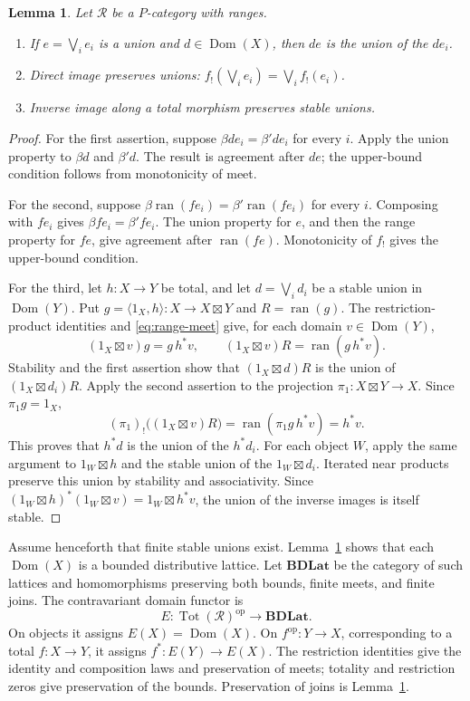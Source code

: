\documentclass[11pt]{article}
\newtheorem{lemma}[theorem]{Lemma}
\theoremstyle{definition}
\newcommand{\R}{\mathscr R}
\newcommand{\BDLat}{\mathbf{BDLat}}
\newcommand{\Tot}{\operatorname{Tot}}
\newcommand{\ran}{\operatorname{ran}}
\begin{document}
\begin{lemma}\label{lem:union-calculus}
Let $\R$ be a $P$-category with ranges.
\begin{enumerate}
\item If $e=\bigvee_i e_i$ is a union and $d\in\operatorname{Dom}(X)$, then $de$ is
      the union of the $de_i$.
\item Direct image preserves unions:
      $f_!(\bigvee_i e_i)=\bigvee_i f_!(e_i)$.
\item Inverse image along a total morphism preserves stable unions.
\end{enumerate}
\end{lemma}
\begin{proof}
For the first assertion, suppose $\beta de_i=\beta'de_i$ for every $i$.
Apply the union property to $\beta d$ and $\beta'd$. The result is agreement
after $de$; the upper-bound condition follows from monotonicity of meet.

For the second, suppose $\beta\ran(fe_i)=\beta'\ran(fe_i)$ for every $i$.
Composing with $fe_i$ gives $\beta fe_i=\beta'fe_i$. The union property for
$e$, and then the range property for $fe$, give agreement after $\ran(fe)$.
Monotonicity of $f_!$ gives the upper-bound condition.

For the third, let $h:X\to Y$ be total, and let $d=\bigvee_i d_i$ be a
stable union in $\operatorname{Dom}(Y)$. Put $g=\langle1_X,h\rangle:X\to X\boxtimes Y$ and
$R=\ran(g)$. The restriction-product identities and
\eqref{eq:range-meet} give, for each domain $v\in\operatorname{Dom}(Y)$,
\[
 (1_X\boxtimes v)g=g\,h^*v,
 \qquad
 (1_X\boxtimes v)R=\ran(g\,h^*v).
\]
Stability and the first assertion show that $(1_X\boxtimes d)R$ is the union
of $(1_X\boxtimes d_i)R$. Apply the second assertion to the projection
$\pi_1:X\boxtimes Y\to X$. Since $\pi_1g=1_X$,
\[
 (\pi_1)_!\bigl((1_X\boxtimes v)R\bigr)
 =\ran(\pi_1g\,h^*v)=h^*v.
\]
This proves that $h^*d$ is the union of the $h^*d_i$.
For each object $W$, apply the same argument to $1_W\boxtimes h$ and
the stable union of the $1_W\boxtimes d_i$. Iterated near products preserve
this union by stability and associativity. Since
$(1_W\boxtimes h)^*(1_W\boxtimes v)=1_W\boxtimes h^*v$, the union of
the inverse images is itself stable.
\end{proof}

Assume henceforth that finite stable unions exist. Lemma~\ref{lem:union-calculus}
shows that each $\operatorname{Dom}(X)$ is a bounded distributive lattice. Let $\BDLat$ be
the category of such lattices and homomorphisms preserving both bounds,
finite meets, and finite joins. The contravariant domain functor is
\[
 E:\Tot(\R)^{\mathrm{op}}\longrightarrow\BDLat.
\]
On objects it assigns $E(X)=\operatorname{Dom}(X)$. On $f^{\mathrm{op}}:Y\to X$, corresponding
to a total $f:X\to Y$, it assigns $f^*:E(Y)\to E(X)$. The restriction
identities give the identity and composition laws and preservation of meets;
totality and restriction zeros give preservation of the bounds. Preservation
of joins is Lemma~\ref{lem:union-calculus}.
\end{document}
